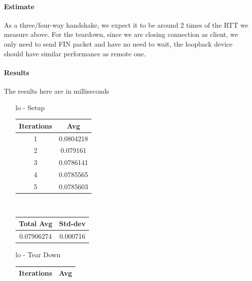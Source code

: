 \paragraph{Estimate}

As a three/four-way handshake, we expect it to be around 2 times of the RTT we measure above. For the teardown, since we are closing connection as client, we only need to send FIN packet and have no need to wait, the loopback device should have similar performance as remote one.

\paragraph{Results}

The results here are in milliseconds

\begin{enumerate}
    \item [lo - Setup]
        \begin{center}
            \begin{tabular}{||c c||} 
             \hline
             Iterations & Avg \\ [0.5ex] 
             \hline\hline
             1 & 0.0804218  \\ 
             \hline
             2 & 0.079161  \\ 
             \hline
             3 & 0.0786141  \\ 
             \hline
             4 & 0.0785565 \\ 
             \hline
             5 & 0.0785603  \\ 
             \hline
             \hline
            \end{tabular} \\
            \begin{tabular}{||c c||} 
             \hline
             Total Avg & Std-dev \\ [0.5ex] 
             \hline\hline
             0.07906274 & 0.000716 \\ 
             \hline
             \hline
            \end{tabular}
        \end{center}
     \item [lo - Tear Down]
        \begin{center}
            \begin{tabular}{||c c||} 
             \hline
             Iterations & Avg \\ [0.5ex] 
             \hline\hline

\end{tabular}
\end{center}
\end{enumerate}
